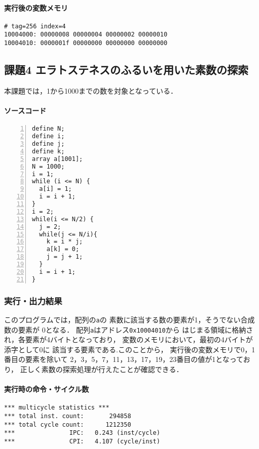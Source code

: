 \paragraph*{実行後の変数メモリ}
\begin{Verbatim}[numbers=none, frame=single,
  fontsize=\small, baselinestretch=0.8]
# tag=256 index=4
10004000: 00000008 00000004 00000002 00000010
10004010: 0000001f 00000000 00000000 00000000
\end{Verbatim}

\subsection{課題4 エラトステネスのふるいを用いた素数の探索}
本課題では，1から1000までの数を対象となっている．
\paragraph*{ソースコード}

\begin{Verbatim}[numbers=left, xleftmargin=10mm, numbersep=6pt, frame=single,
  fontsize=\small, baselinestretch=0.8]
define N;
define i;
define j;
define k;
array a[1001];
N = 1000;
i = 1;
while (i <= N) {
  a[i] = 1;
  i = i + 1;
}
i = 2;
while(i <= N/2) {
  j = 2;
  while(j <= N/i){
    k = i * j;
    a[k] = 0;
    j = j + 1;
  }
  i = i + 1;
}
\end{Verbatim}

\subsubsection{実行・出力結果}
このプログラムでは，配列の\verb|a|の
素数に該当する数の要素が1，そうでない合成数の要素が
0となる．
配列\verb|a|はアドレス\verb|0x10004010|から
はじまる領域に格納され，各要素が4バイトとなっており，
変数のメモリにおいて，最初の4バイトが添字として0に
該当する要素である.このことから，
実行後の変数メモリで0，1番目の要素を除いて
2，3，5，7，11，13，17，19，23番目の値が1となっており，
正しく素数の探索処理が行えたことが確認できる．

\paragraph*{実行時の命令・サイクル数}
\begin{Verbatim}[numbers=none, frame=single,
fontsize=\small, baselinestretch=0.8]
*** multicycle statistics ***
*** total inst. count:       294858
*** total cycle count:      1212350
***               IPC:   0.243 (inst/cycle)
***               CPI:   4.107 (cycle/inst)
\end{Verbatim}

